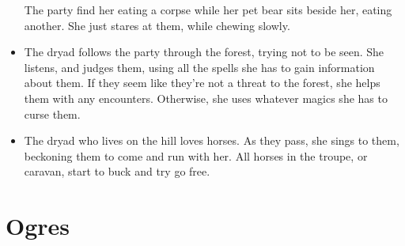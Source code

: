 \begin{multicols}{2}
\begin{itemize}
  The party find her eating a corpse while her pet bear sits beside her, eating another.
  She just stares at them, while chewing slowly.
  \item
  The dryad follows the party through the forest, trying not to be seen.
  She listens, and judges them, using all the spells she has to gain information about them.
  If they seem like they're not a threat to the forest, she helps them with any encounters.
  Otherwise, she uses whatever magics she has to curse them.
  \item
  The dryad who lives on the hill loves horses.
  As they pass, she sings to them, beckoning them to come and run with her.
  All horses in the troupe, or caravan, start to buck and try go free.
\end{itemize}

\end{multicols}



\section[Ogre]{Ogres}
\label{ogre}

